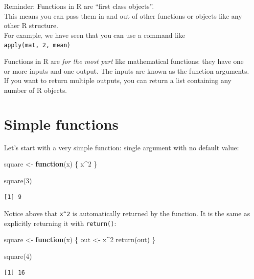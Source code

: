 \documentclass[
]{book}
\newenvironment{Shaded}{\begin{snugshade}}{\end{snugshade}}
\newcommand{\ControlFlowTok}[1]{\textcolor[rgb]{0.13,0.29,0.53}{\textbf{#1}}}
\newcommand{\DecValTok}[1]{\textcolor[rgb]{0.00,0.00,0.81}{#1}}
\newcommand{\FunctionTok}[1]{\textcolor[rgb]{0.00,0.00,0.00}{#1}}
\newcommand{\NormalTok}[1]{#1}
\newcommand{\OtherTok}[1]{\textcolor[rgb]{0.56,0.35,0.01}{#1}}
\newcommand{\SpecialCharTok}[1]{\textcolor[rgb]{0.00,0.00,0.00}{#1}}
\begin{document}
Reminder: Functions in R are ``first class objects''.\\
This means you can pass them in and out of other functions or objects like any other R structure.\\
For example, we have seen that you can use a command like \texttt{apply(mat,\ 2,\ mean)}

Functions in R are \emph{for the most part} like mathematical functions: they have one or more inputs and one output. The inputs are known as the function arguments. If you want to return multiple outputs, you can return a list containing any number of R objects.

\hypertarget{simple-functions}{%
\section{Simple functions}\label{simple-functions}}

Let's start with a very simple function: single argument with no default value:

\begin{Shaded}
\begin{Highlighting}[]
\NormalTok{square }\OtherTok{\textless{}{-}} \ControlFlowTok{function}\NormalTok{(x) \{}
\NormalTok{  x}\SpecialCharTok{\^{}}\DecValTok{2}
\NormalTok{\}}

\FunctionTok{square}\NormalTok{(}\DecValTok{3}\NormalTok{)}
\end{Highlighting}
\end{Shaded}

\begin{verbatim}
[1] 9
\end{verbatim}

Notice above that \texttt{x\^{}2} is automatically returned by the function. It is the same as explicitly returning it with \texttt{return()}:

\begin{Shaded}
\begin{Highlighting}[]
\NormalTok{square }\OtherTok{\textless{}{-}} \ControlFlowTok{function}\NormalTok{(x) \{}
\NormalTok{  out }\OtherTok{\textless{}{-}}\NormalTok{ x}\SpecialCharTok{\^{}}\DecValTok{2}
  \FunctionTok{return}\NormalTok{(out)}
\NormalTok{\}}

\FunctionTok{square}\NormalTok{(}\DecValTok{4}\NormalTok{)}
\end{Highlighting}
\end{Shaded}

\begin{verbatim}
[1] 16
\end{verbatim}
\end{document}
